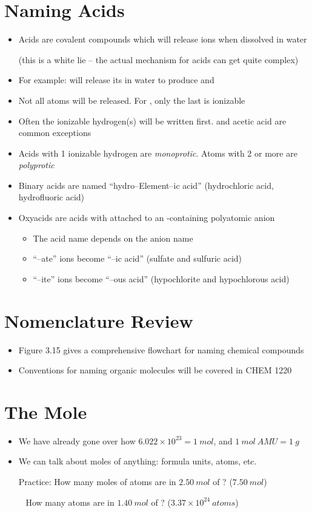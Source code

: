 \documentclass[12pt, openany, letterpaper]{memoir}
\begin{document}
\section{Naming Acids}
\begin{itemize}
	\item Acids are covalent compounds which will release  ions when dissolved in water 
	
	(this is a white lie -- the actual mechanism for acids can get quite complex)
	\item For example:  will release its  in water to produce  and 
	\item Not all  atoms will be released. For , only the last  is ionizable
	\item Often the ionizable hydrogen(s) will be written first.  and acetic acid are common exceptions
	\item Acids with 1 ionizable hydrogen are \emph{monoprotic}. Atoms with 2 or more are \emph{polyprotic}
	\item Binary acids are named ``hydro--Element--ic acid'' (hydrochloric acid, hydrofluoric acid) 
	\item Oxyacids are acids with  attached to an -containing polyatomic anion
	\begin{itemize}
		\item The acid name depends on the anion name
		\item ``--ate'' ions become ``--ic acid'' (sulfate and sulfuric acid)
		\item ``--ite'' ions become ``--ous acid'' (hypochlorite and hypochlorous acid)
	\end{itemize}		
\end{itemize}
\section{Nomenclature Review}
\begin{itemize}	
	\item Figure 3.15 gives a comprehensive flowchart for naming chemical compounds
	\item Conventions for naming organic molecules will be covered in CHEM 1220
\end{itemize}
\section{The Mole}
\begin{itemize}
	\item We have already gone over how $6.022\times10^{23}=1~mol$, and $1~mol~AMU=1~g$
	\item We can talk about moles of anything: formula units, atoms, etc.
	
	Practice: How many moles of  atoms are in $2.50~mol$ of ? ($7.50~mol$)
	
	~\hphantom{Practice:} How many  atoms are in $1.40~mol$ of ? ($3.37\times10^{24}~atoms$)
\end{itemize}
\end{document}
